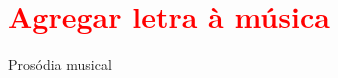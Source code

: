 \section{\textcolor{red}{Agregar letra à música}}

\cite[pp. 149]{medteoria}

Prosódia musical \cite[pp. 336]{medteoria}
\cite[pp. 60]{howard1991aprendendo}


